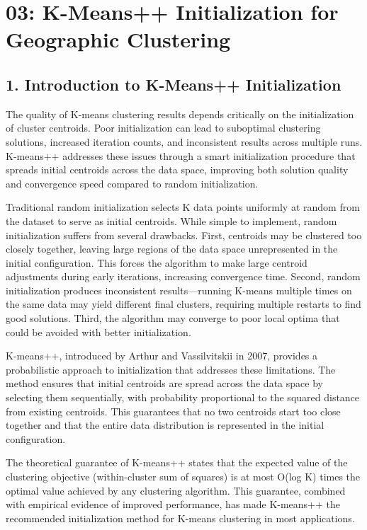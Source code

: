 \chapter{03: K-Means++ Initialization for Geographic Clustering}

\section{1. Introduction to K-Means++ Initialization}

The quality of K-means clustering results depends critically on the initialization of cluster centroids. Poor initialization can lead to suboptimal clustering solutions, increased iteration counts, and inconsistent results across multiple runs. K-means++ addresses these issues through a smart initialization procedure that spreads initial centroids across the data space, improving both solution quality and convergence speed compared to random initialization.

Traditional random initialization selects K data points uniformly at random from the dataset to serve as initial centroids. While simple to implement, random initialization suffers from several drawbacks. First, centroids may be clustered too closely together, leaving large regions of the data space unrepresented in the initial configuration. This forces the algorithm to make large centroid adjustments during early iterations, increasing convergence time. Second, random initialization produces inconsistent results—running K-means multiple times on the same data may yield different final clusters, requiring multiple restarts to find good solutions. Third, the algorithm may converge to poor local optima that could be avoided with better initialization.

K-means++, introduced by Arthur and Vassilvitskii in 2007, provides a probabilistic approach to initialization that addresses these limitations. The method ensures that initial centroids are spread across the data space by selecting them sequentially, with probability proportional to the squared distance from existing centroids. This guarantees that no two centroids start too close together and that the entire data distribution is represented in the initial configuration.

The theoretical guarantee of K-means++ states that the expected value of the clustering objective (within-cluster sum of squares) is at most O(log K) times the optimal value achieved by any clustering algorithm. This guarantee, combined with empirical evidence of improved performance, has made K-means++ the recommended initialization method for K-means clustering in most applications.

